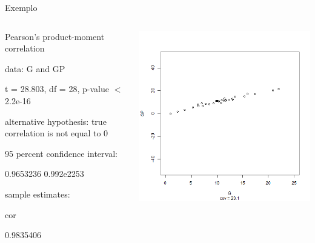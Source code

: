 \documentclass{beamer}
\begin{document}
\begin{frame}{Exemplo}
  \begin{columns}
    \begin{column}{5cm}
      \begin{block}{}
        \tiny
        Pearson's product-moment correlation
       
         data:  G and GP
                
t = 28.803, df = 28, p-value $<$ 2.2e-16
                
                alternative hypothesis: true correlation is not equal to 0
                
                95 percent confidence interval:
                
                0.9653236 0.992e2253
                
                sample estimates:
                
                cor
                
0.9835406 
      \end{block}
   \end{column}
    \begin{column}{5cm}
  \begin{center}
    \includegraphics[height=.8\textheight]{Cap17/anim-1}
  \end{center}
    \end{column}
\end{columns}
\end{frame}
\end{document}
